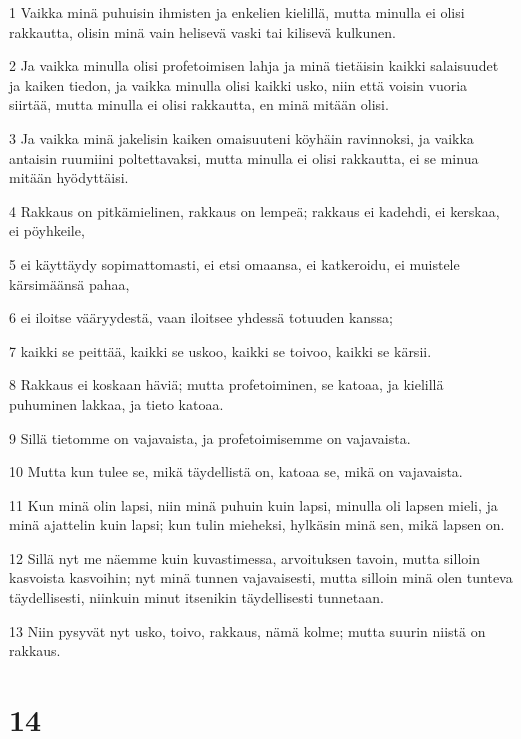 \par 1 Vaikka minä puhuisin ihmisten ja enkelien kielillä, mutta minulla ei olisi rakkautta, olisin minä vain helisevä vaski tai kilisevä kulkunen.
\par 2 Ja vaikka minulla olisi profetoimisen lahja ja minä tietäisin kaikki salaisuudet ja kaiken tiedon, ja vaikka minulla olisi kaikki usko, niin että voisin vuoria siirtää, mutta minulla ei olisi rakkautta, en minä mitään olisi.
\par 3 Ja vaikka minä jakelisin kaiken omaisuuteni köyhäin ravinnoksi, ja vaikka antaisin ruumiini poltettavaksi, mutta minulla ei olisi rakkautta, ei se minua mitään hyödyttäisi.
\par 4 Rakkaus on pitkämielinen, rakkaus on lempeä; rakkaus ei kadehdi, ei kerskaa, ei pöyhkeile,
\par 5 ei käyttäydy sopimattomasti, ei etsi omaansa, ei katkeroidu, ei muistele kärsimäänsä pahaa,
\par 6 ei iloitse vääryydestä, vaan iloitsee yhdessä totuuden kanssa;
\par 7 kaikki se peittää, kaikki se uskoo, kaikki se toivoo, kaikki se kärsii.
\par 8 Rakkaus ei koskaan häviä; mutta profetoiminen, se katoaa, ja kielillä puhuminen lakkaa, ja tieto katoaa.
\par 9 Sillä tietomme on vajavaista, ja profetoimisemme on vajavaista.
\par 10 Mutta kun tulee se, mikä täydellistä on, katoaa se, mikä on vajavaista.
\par 11 Kun minä olin lapsi, niin minä puhuin kuin lapsi, minulla oli lapsen mieli, ja minä ajattelin kuin lapsi; kun tulin mieheksi, hylkäsin minä sen, mikä lapsen on.
\par 12 Sillä nyt me näemme kuin kuvastimessa, arvoituksen tavoin, mutta silloin kasvoista kasvoihin; nyt minä tunnen vajavaisesti, mutta silloin minä olen tunteva täydellisesti, niinkuin minut itsenikin täydellisesti tunnetaan.
\par 13 Niin pysyvät nyt usko, toivo, rakkaus, nämä kolme; mutta suurin niistä on rakkaus.

\chapter{14}

